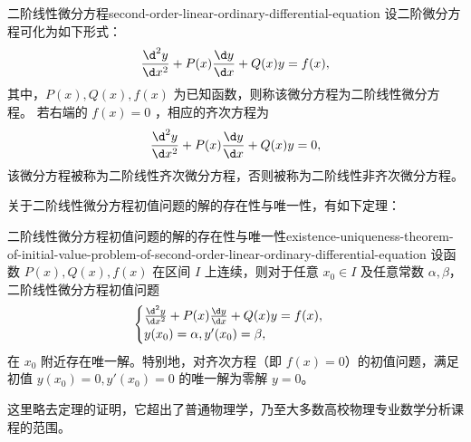 \begin{definition}{二阶线性微分方程}{second-order-linear-ordinary-differential-equation}
    设二阶微分方程可化为如下形式：
    \begin{equation}
        \frac{\d^2 y}{\d x^2} + P(x) \frac{\d y}{\d x} + Q(x) y = f(x) \label{eq:second-order-linear-ordinary-differential-equation},
    \end{equation}
    其中，$ P(x) , Q(x) , f(x) $ 为已知函数，则称该微分方程为二阶线性微分方程。
    若右端的 $ f(x) = 0 $ ，相应的齐次方程为
    \begin{equation}
        \frac{\d^2 y}{\d x^2} + P(x) \frac{\d y}{\d x} + Q(x) y = 0 \label{eq:homogeneous-second-order-linear-ordinary-differential-equation},
    \end{equation}
    该微分方程被称为二阶线性齐次微分方程，否则被称为二阶线性非齐次微分方程。
\end{definition}

关于二阶线性微分方程初值问题的解的存在性与唯一性，有如下定理：
\begin{theorem}{二阶线性微分方程初值问题的解的存在性与唯一性}{existence-uniqueness-theorem-of-initial-value-problem-of-second-order-linear-ordinary-differential-equation}
    设函数 $ P(x) , Q(x) , f(x) $ 在区间 $ I $ 上连续，则对于任意 $ x_0 \in I $ 及任意常数 $ \alpha , \beta $，二阶线性微分方程初值问题
    \begin{equation*}
        \begin{cases}
            \frac{\d^2 y}{\d x^2} + P(x) \frac{\d y}{\d x} + Q(x) y = f(x), \\
            y(x_0) = \alpha, y'(x_0) = \beta,
        \end{cases}
    \end{equation*}
    在 $ x_0 $ 附近存在唯一解。特别地，对齐次方程（即 $ f(x) = 0 $）的初值问题，满足初值 $ y(x_0) = 0 , y'(x_0) = 0 $ 的唯一解为零解 $ y = 0 $。

    这里略去定理的证明，它超出了普通物理学，乃至大多数高校物理专业数学分析课程的范围。
\end{theorem}


